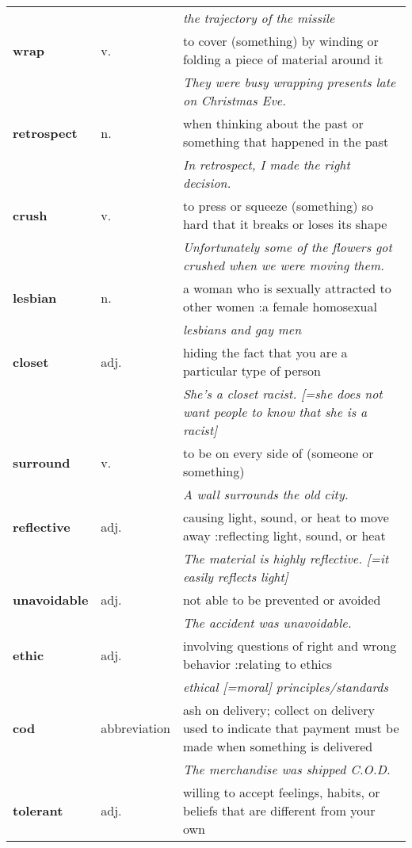 \documentclass[a4paper]{article}
\begin{document}
\begin{longtable}{llp{11cm}}
 & & \textit{the trajectory of the missile}\\[0.08cm]
\textbf{wrap} & v. &  to cover (something) by winding or folding a piece of material around it \\
 & & \textit{They were busy wrapping presents late on Christmas Eve.}\\[0.08cm]
\textbf{retrospect} & n. &  when thinking about the past or something that happened in the past \\
 & & \textit{In retrospect, I made the right decision.}\\[0.08cm]
\textbf{crush} & v. &  to press or squeeze (something) so hard that it breaks or loses its shape \\
 & & \textit{Unfortunately some of the flowers got crushed when we were moving them.}\\[0.08cm]
\textbf{lesbian} & n. &  a woman who is sexually attracted to other women :a female homosexual \\
 & & \textit{lesbians and gay men}\\[0.08cm]
\textbf{closet} & adj. &  hiding the fact that you are a particular type of person \\
 & & \textit{She's a closet racist. [=she does not want people to know that she is a racist]}\\[0.08cm]
\textbf{surround} & v. &  to be on every side of (someone or something) \\
 & & \textit{A wall surrounds the old city.}\\[0.08cm]
\textbf{reflective} & adj. &  causing light, sound, or heat to move away :reflecting light, sound, or heat \\
 & & \textit{The material is highly reflective. [=it easily reflects light]}\\[0.08cm]
\textbf{unavoidable} & adj. &  not able to be prevented or avoided \\
 & & \textit{The accident was unavoidable.}\\[0.08cm]
\textbf{ethic} & adj. &  involving questions of right and wrong behavior :relating to ethics \\
 & & \textit{ethical [=moral] principles/standards}\\[0.08cm]
\textbf{cod} & abbreviation &  ash on delivery; collect on delivery used to indicate that payment must be made when something is delivered \\
 & & \textit{The merchandise was shipped C.O.D.}\\[0.08cm]
\textbf{tolerant} & adj. &  willing to accept feelings, habits, or beliefs that are different from your own \\

\end{longtable}
\end{document}
